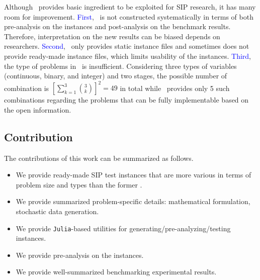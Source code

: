 Although \siplib\ provides basic ingredient to be exploited for SIP research, it has many room for improvement. \textcolor{blue}{First}, \siplib\ is not constructed systematically in terms of both pre-analysis on the instances and post-analysis on the benchmark results. Therefore, interpretation on the new results can be biased depends on researchers. \textcolor{blue}{Second}, \siplib\ only provides static instance files and sometimes does not provide ready-made instance files, which limits usability of the instances. \textcolor{blue}{Third}, the type of problems in \siplib\ is insufficient. Considering three types of variables (continuous, binary, and integer) and two stages, the possible number of combination is $\left[\sum_{k=1}^3\binom{3}{k}\right]^2=49$ in total while \siplib\ provides only 5 such combinations regarding the problems that can be fully implementable based on the open information.

\subsection{Contribution} \label{subsec:contribution}
The contributions of this work can be summarized as follows.
\begin{itemize}
	\item We provide ready-made SIP test instances that are more various in terms of problem size and types than the former \siplib.
	\item We provide summarized problem-specific details: mathematical formulation, stochastic data generation.
	\item We provide \texttt{Julia}-based utilities for generating/pre-analyzing/testing instances.
	\item We provide pre-analysis on the instances.
	\item We provide well-summarized benchmarking experimental results.
\end{itemize}





